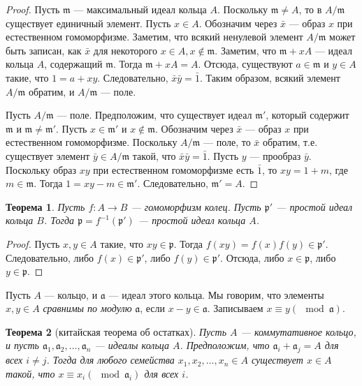 \documentclass[12pt, titlepage, oneside]{amsbook}
\newcommand{\aaa}{\mathfrak{a}}
\newcommand{\ppp}{\mathfrak{p}}
\newcommand{\mmm}{\mathfrak{m}}
\newtheorem{theorem}{Теорема}[chapter]
\theoremstyle{definition}
\theoremstyle{remark}
\begin{document}
\begin{proof}
	Пусть $\mmm$ --- максимальный идеал кольца $A$.
	Поскольку $\mmm\neq A$, то в $A/\mmm$ существует единичный элемент. Пусть $x\in A$. Обозначим через $\bar{x}$ --- образ $x$ при естественном гомоморфизме. Заметим, что всякий ненулевой элемент $A/\mmm$ может быть записан, как $\bar{x}$ для некоторого $x\in A, x\not\in\mmm$. Заметим, что $\mmm+xA$ --- идеал кольца $A$, содержащий $\mmm$. Тогда $\mmm+xA=A$. Отсюда, существуют $a\in\mmm$ и $y\in A$ такие, что $1=a+xy$. Следовательно, $\bar{x}\bar{y}=\bar{1}$. Таким образом, всякий элемент $A/\mmm$ обратим, и $A/\mmm$ --- поле.
	
	Пусть $A/\mmm$ --- поле. Предположим, что существует идеал $\mmm'$, который содержит $\mmm$ и $\mmm\neq\mmm'$. Пусть $x\in\mmm'$ и $x\not\in\mmm$. Обозначим через $\bar{x}$ --- образ $x$ при естественном гомоморфизме. Поскольку $A/\mmm$ --- поле, то $\bar{x}$ обратим, т.е. существует элемент $\bar{y}\in A/\mmm$ такой, что $\bar{x}\bar{y}=\bar{1}$. Пусть $y$ --- прообраз $\bar{y}$. Поскольку образ $xy$ при естественном гомоморфизме есть $\bar{1}$, то $xy=1+m$, где $m\in\mmm$. Тогда $1=xy-m\in\mmm'$. Следовательно, $\mmm'=A$.
\end{proof}

\begin{theorem}
	\label{KomKol4} Пусть $f\colon A\rightarrow B$ --- гомоморфизм колец. Пусть $\ppp'$ --- простой идеал кольца $B$. Тогда $\ppp=f^{-1}(\ppp')$ --- простой идеал кольца $A$.
\end{theorem}

\begin{proof}
	Пусть $x,y\in A$ такие, что $xy\in \ppp$. Тогда $f(xy)=f(x)f(y)\in\ppp'$. Следовательно, либо $f(x)\in\ppp'$, либо $f(y)\in\ppp'$. Отсюда, либо $x\in\ppp$, либо $y\in\ppp$.
\end{proof}

Пусть $A$ --- кольцо, и $\aaa$ --- идеал этого кольца. Мы говорим, что элементы $x,y\in A$ \emph{сравнимы по модулю} $\aaa$, если $x-y\in\aaa$. Записываем $x\equiv y (\mod\aaa)$.

\begin{theorem}[китайская теорема об остатках]
	\label{KitOst} Пусть $A$ --- коммутативное кольцо, и пусть $\aaa_1,\aaa_2,\ldots,\aaa_n$ --- идеалы кольца $A$. Предположим, что $\aaa_i+\aaa_j=A$ для всех $i\neq j$. Тогда для любого семейства $x_1,x_2,\ldots, x_n\in A$ существует $x\in A$ такой, что $x\equiv x_i (\mod\aaa_i)$ для всех $i$.
\end{theorem}
\end{document}
